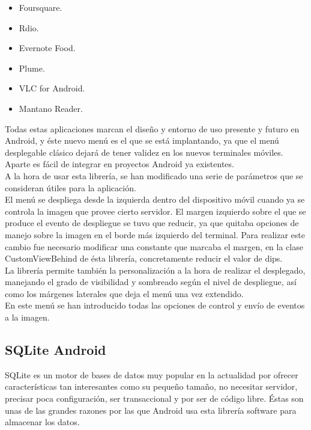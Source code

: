 \begin{itemize}
\item Foursquare.
\item Rdio.
\item Evernote Food.
\item Plume.
\item VLC for Android.
\item Mantano Reader.\\
\end{itemize}

Todas estas aplicaciones marcan el diseño y entorno de uso presente y futuro en Android, y éste nuevo menú es el que se está implantando, ya que el menú desplegable clásico dejará de tener validez en los nuevos terminales móviles. Aparte es fácil de integrar en proyectos Android ya existentes.\\

A la hora de usar esta librería, se han modificado una serie de parámetros que se consideran útiles para la aplicación.\\

El menú se despliega desde la izquierda dentro del dispositivo móvil cuando ya se controla la imagen que provee cierto servidor. El margen izquierdo sobre el que se produce el evento de despliegue se tuvo que reducir, ya que quitaba opciones de manejo sobre la imagen en el borde más izquierdo del terminal. Para realizar este cambio fue necesario modificar una constante que marcaba el margen, en la clase CustomViewBehind de ésta librería, concretamente reducir el valor de dips. \\

La librería permite también la personalización a la hora de realizar el desplegado, manejando el grado de visibilidad y sombreado según el nivel de despliegue, así como los márgenes laterales que deja el menú una vez extendido.\\

En este menú se han introducido todas las opciones de control y envío de eventos a la imagen.\\

\subsection{SQLite Android}

SQLite es un motor de bases de datos muy popular en la actualidad por ofrecer características tan interesantes como su pequeño tamaño, no necesitar servidor, precisar poca configuración, ser transaccional y por ser de código libre. Éstas son unas de las grandes razones por las que Android usa esta librería software para almacenar los datos. \\

